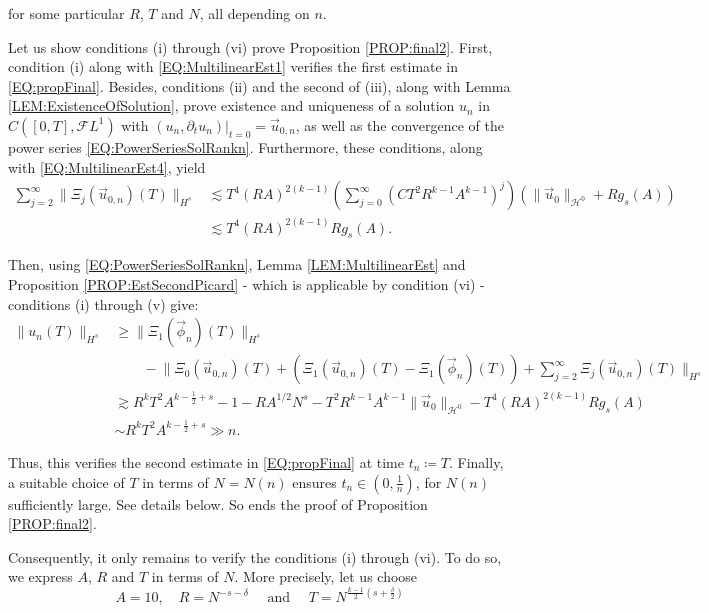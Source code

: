 \documentclass[letterpaper, 11pt,  reqno]{amsart}
\newcommand{\1}{\hspace{0.5mm}\text{I}\hspace{0.5mm}}
\newcommand{\noi}{\noindent}
\newcommand{\FL}{\mathcal{F}L} %
\renewcommand{\H}{\mathcal{H}}
\newcommand{\dl}{\delta}
\newcommand{\dt}{\partial_t}
\newcommand{\les}{\lesssim}
\newcommand{\ges}{\gtrsim}
\numberwithin{equation}{section}
\numberwithin{theorem}{section}
\begin{document}
\noi for some particular $R$, $T$ and $N$, all depending on $n$.

Let us show conditions (i) through (vi) prove Proposition \ref{PROP:final2}. First, condition (i) along with \eqref{EQ:MultilinearEst1} verifies the first estimate in \eqref{EQ:propFinal}. Besides, conditions (ii) and the second of (iii), along with Lemma \ref{LEM:ExistenceOfSolution}, prove existence and uniqueness of a solution $u_n$ in $C([0,T], \FL^1)$ with $(u_n , \dt u_n) |_{t=0} = \vec{u}_{0,n}$, as well as the convergence of the power series \eqref{EQ:PowerSeriesSolRankn}. Furthermore, these conditions, along with \eqref{EQ:MultilinearEst4}, yield
\begin{align*}
\sum^{\infty}_{j = 2} \| \Xi_j (\vec{u}_{0,n})(T) \|_{H^s} & \les T^4 (RA)^{2(k-1)} \left(\sum^{\infty}_{j = 0} ( C T^2 R^{k-1}A^{k-1} )^j \right) \left( \| \vec{u}_0 \|_{\H^0} + Rg_s (A) \right) \\
	& \les T^4 (RA)^{2(k-1)} R g_s (A).
\end{align*}

\noi Then, using \eqref{EQ:PowerSeriesSolRankn}, Lemma \ref{LEM:MultilinearEst} and Proposition \ref{PROP:EstSecondPicard} - which is applicable by condition (vi) - conditions (i) through (v) give:
\begin{align*}
\| u_n (T) \|_{H^s} & \geq \|\Xi_1 (\vec{\phi}_{n})(T) \|_{H^s} \\
	& \qquad - \bigg\| \Xi_0 (\vec{u}_{0,n})(T) + \left( \Xi_1 (\vec{u}_{0,n})(T) - \Xi_1 (\vec{\phi}_{n})(T) \right)  +  \sum^{\infty}_{j = 2} \Xi_j (\vec{u}_{0,n})(T) \bigg\|_{H^s} \\
	 & \ges R^k T^2 A^{k - \frac 12 + s} - 1 - RA^{1/2} N^s - T^2 R^{k-1}A^{k-1} \| \vec{u}_0 \|_{\H^0}  -  T^4 (RA)^{2(k-1)} R g_s (A) \\
	& \sim R^k T^2 A^{k - \frac 12 + s} \gg n.
\end{align*}

Thus, this verifies the second estimate in \eqref{EQ:propFinal} at time $t_n \coloneqq T$. Finally, a suitable choice of $T$ in terms of $N = N(n)$ ensures $t_n \in (0, \frac 1n)$, for $N(n)$ sufficiently large. See details below. So ends the proof of Proposition \ref{PROP:final2}.

Consequently, it only remains to verify the conditions (i) through (vi). To do so, we express $A$, $R$ and $T$ in terms of $N$. More precisely, let us choose
$$
A = 10, \quad R = N^{-s-\dl} \quad \text{ and } \quad T = N^{\frac{k-1}{2}(s + \frac \dl2)}
$$
\end{document}
